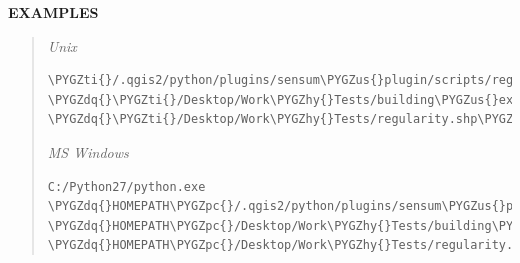 \documentclass[letterpaper,10pt,english]{sphinxmanual}
\def\PYGZus{\char`\_}
\def\PYGZpc{\char`\%}
\def\PYGZhy{\char`\-}
\def\PYGZdq{\char`\"}
\def\PYGZti{\char`\~}
\begin{document}
\textbf{EXAMPLES}
\begin{quote}

\emph{Unix}

\begin{Verbatim}[frame=single,commandchars=\\\{\}]
\PYGZti{}/.qgis2/python/plugins/sensum\PYGZus{}plugin/scripts/regularity.py \PYGZdq{}\PYGZti{}/Desktop/Work\PYGZhy{}Tests/building\PYGZus{}extraction.shp\PYGZdq{} \PYGZdq{}\PYGZti{}/Desktop/Work\PYGZhy{}Tests/regularity.shp\PYGZdq{}
\end{Verbatim}

\emph{MS Windows}

\begin{Verbatim}[frame=single,commandchars=\\\{\}]
C:/Python27/python.exe \PYGZdq{}HOMEPATH\PYGZpc{}/.qgis2/python/plugins/sensum\PYGZus{}plugin/scripts/regularity.py\PYGZdq{} \PYGZdq{}HOMEPATH\PYGZpc{}/Desktop/Work\PYGZhy{}Tests/building\PYGZus{}extraction.shp\PYGZdq{} \PYGZdq{}HOMEPATH\PYGZpc{}/Desktop/Work\PYGZhy{}Tests/regularity.shp\PYGZdq{}
\end{Verbatim}
\end{quote}
\end{document}
